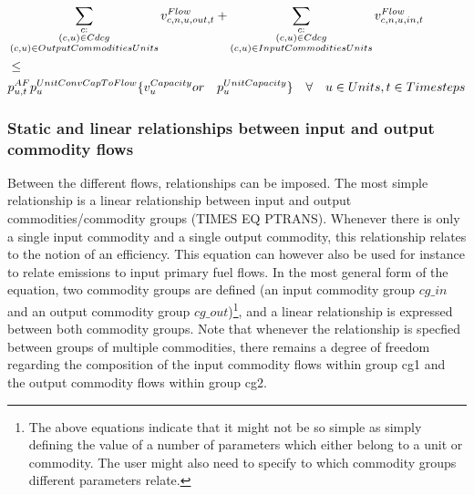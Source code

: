 
\begin{align} \label{eq:max_capacity}
&\sum_{\substack{\commodity :  \\ \Cdcg \\ \OutputCommoditiesUnits}} \vFlow[\commodity, \node, \unit, out, \timestep] + \sum_{\substack{\commodity :  \\  \Cdcg \\ \InputCommoditiesUnits}} \vFlow[\commodity, \node, \unit, in, \timestep] \nonumber \\
&  \le \nonumber \\
&\pAF \pUnitConvCapToFlow \{\vCapacity or \quad \pUnitCapacity\} \quad \forall \quad \units, \timesteps
\end{align}



\subsubsection{Static and linear relationships between input and output commodity flows}
Between the different flows, relationships can be imposed. The most simple relationship is a linear relationship between input and output commodities/commodity groups (TIMES EQ PTRANS). Whenever there is only a single input commodity and a single output commodity, this relationship relates to the notion of an efficiency. This equation can however also be used for instance to relate emissions to input primary fuel flows. In the most general form of the equation, two commodity groups are defined (an input commodity group $cg\_in$ and an output commodity group $cg\_out$)\footnote{The above equations indicate that it might not be so simple as simply defining the value of a number of parameters which either belong to a unit or commodity. The user might also need to specify to which commodity groups different parameters relate.}, and a linear relationship is expressed between both commodity groups. Note that whenever the relationship is specfied between groups of multiple commodities, there remains a degree of freedom regarding the composition of the input commodity flows within group cg1 and the output commodity flows within group cg2. 

